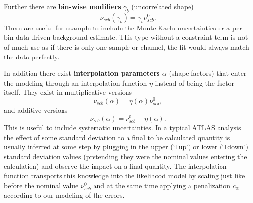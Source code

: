 Further there are \textbf{bin-wise modifiers} $\gamma_b$ (uncorrelated shape)
\begin{equation}
    \nu_{scb}(\gamma_b)=\gamma_b \nu_{scb}^0.
\end{equation}
These are useful for example to include the Monte Karlo uncertainties or a per bin data-driven background estimate. This type without a constraint term is not of much use as if there is only one sample or channel, the fit would always match the data perfectly.

In addition there exist \textbf{interpolation parameters $\alpha$} (shape factors) that enter the modeling through an interpolation function $\eta$ instead of being the factor itself. They exist in multiplicative versions 
\begin{equation}
    \nu_{scb}(\alpha)=\eta(\alpha) \nu_{scb}^0,
\end{equation}
and additive versions
\begin{equation}
    \nu_{scb}(\alpha)=\nu_{scb}^0 + \eta(\alpha).
\end{equation}
This is useful to include systematic uncertainties. In a typical ATLAS analysis the effect of some standard deviation to a final to be calculated quantity is usually inferred at some step by plugging in the upper (`1up') or lower (`1down') standard deviation values (pretending they were the nominal values entering the calculation) and observe the impact on a final quantity. The interpolation function transports this knowledge into the likelihood model by scaling just like before the nominal value $\nu_{scb}^0$ and at the same time applying a penalization $c_\alpha$ according to our modeling of the errors. 

